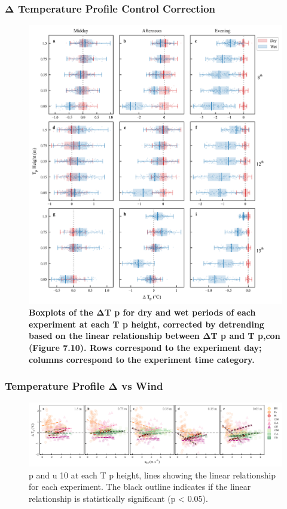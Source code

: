 \documentclass[final,3p,times,authoryear]{elsarticle}
\begin{document}
{\subsubsection{Δ Temperature Profile Control Correction}\label{sec:appendix7.5.3}
\begin{figure}
\centering
\includegraphics[trim={0 0 0 0},clip,scale=1.0]{pict040.png}
\caption{\bf Boxplots of the ΔT p for dry and wet periods of each experiment at each T p height, corrected
by detrending based on the linear relationship between ΔT p and T p,con (Figure 7.10). Rows correspond to
the experiment day; columns correspond to the experiment time category.}
 \label{fig:7.11}
\end{figure}

\subsubsection{Temperature Profile Δ vs Wind}\label{sec:appendix7.5.4}

\begin{figure}
\centering
\includegraphics[trim={0 0 0 0},clip,scale=1.0]{pict041.png}
\caption{ p and u 10 at each T p height, lines showing the linear relationship for each experiment. The
black outline indicates if the linear relationship is statistically significant (p < 0.05).}
 \label{fig:7.12}
\end{figure}


}
\end{document}
